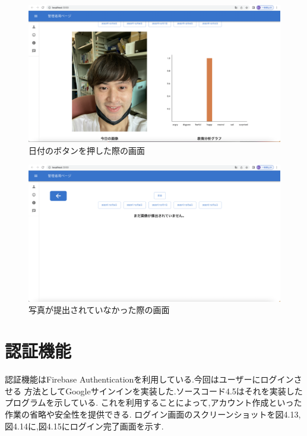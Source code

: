 \clearpage

\begin{figure}[!h]
	\begin{center}
			\includegraphics[scale=0.3, clip]{./img/sample10.png}
			\caption{日付のボタンを押した際の画面}
			\label{fig:図の名前}
	\end{center}
\end{figure}

\begin{figure}[!h]
	\begin{center}
			\includegraphics[scale=0.3, clip]{./img/sample11.png}
			\caption{写真が提出されていなかった際の画面}
			\label{fig:図の名前}
	\end{center}
\end{figure}

\clearpage

\section{認証機能}

認証機能はFirebase Authenticationを利用している.今回はユーザーにログインさせる
方法としてGoogleサインインを実装した.ソースコード4.5はそれを実装したプログラムを示している.
これを利用することによって,アカウント作成といった作業の省略や安全性を提供できる.
ログイン画面のスクリーンショットを図4.13,図4.14に,図4.15にログイン完了画面を示す.
\\

